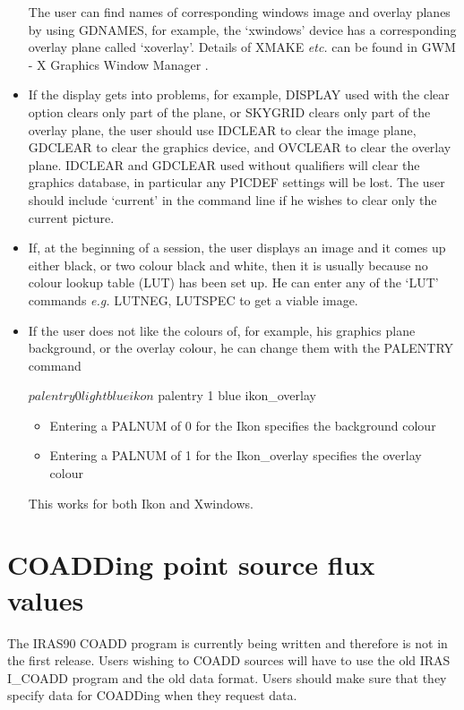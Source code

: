 \documentclass[twoside,11pt]{starlink}
\begin{document}
\begin{itemize}
The user can find names of corresponding windows image and overlay planes by
using
GDNAMES, for example, the `xwindows' device has a corresponding overlay plane
called `xoverlay'. Details of XMAKE \emph{etc.} can be found in GWM - X Graphics
Window Manager .
\item If the display gets into problems, for example, DISPLAY used with the
clear option clears only part of the plane, or SKYGRID clears only part of the
overlay plane, the user should use IDCLEAR to clear the image plane, GDCLEAR to
clear the graphics device, and OVCLEAR to clear the overlay plane. IDCLEAR and
GDCLEAR used without qualifiers will clear the graphics database, in particular
any PICDEF settings will be lost. The user should include `current' in the
command line if he wishes to clear only the current picture.
\item If, at the beginning of a session, the user displays an image and it
comes up either black, or two colour black and white, then it is usually
because no colour lookup table (LUT) has been set up. He can enter any of
the `LUT' commands \emph{e.g.} LUTNEG, LUTSPEC to get a viable image.
\item If the user does not like the colours of, for example, his graphics
plane background, or the overlay colour, he can change them with the PALENTRY
command
\begin{small}
\begin{terminalv}
$ palentry 0 lightblue ikon
$ palentry 1 blue ikon_overlay
\end{terminalv}
\end{small}
\begin{itemize}
\item Entering a PALNUM of 0 for the Ikon specifies the background colour
\item Entering a PALNUM of 1 for the Ikon\_overlay specifies the overlay colour
\end{itemize}
This works for both Ikon and Xwindows.
\end{itemize}

\section{COADDing point source flux values
\label{m:coadd}}

The IRAS90 COADD program is currently being written and therefore is
not in the first release. Users wishing to COADD sources will have to use the
old IRAS I\_COADD program and the old data format. Users should make sure that
they specify data for COADDing when they request data.
\end{document}
